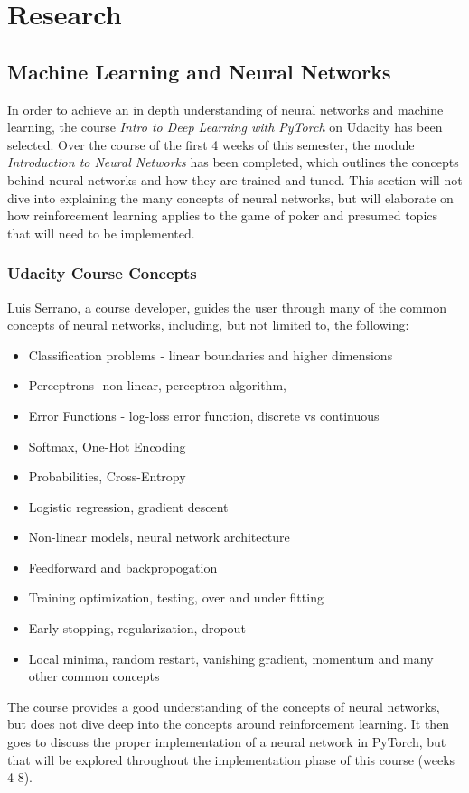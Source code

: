 \documentclass[12pt]{article}
\begin{document}
\section{Research}
\subsection{Machine Learning and Neural Networks}
In order to achieve an in depth understanding of neural networks and machine learning, the course \textit{Intro to Deep Learning with PyTorch} on Udacity has been selected. Over the course of the first 4 weeks of this semester, the module \textit{Introduction to Neural Networks} has been completed, which outlines the concepts behind neural networks and how they are trained and tuned. This section will not dive into explaining the many concepts of neural networks, but will elaborate on how reinforcement learning applies to the game of poker and presumed topics that will need to be implemented.
\subsubsection{Udacity Course Concepts}
Luis Serrano, a course developer, guides the user through many of the common concepts of neural networks, including, but not limited to, the following:

\begin{itemize}
	\item Classification problems - linear boundaries and higher dimensions
	\item Perceptrons- non linear, perceptron algorithm,
	\item Error Functions - log-loss error function, discrete vs continuous
	\item Softmax, One-Hot Encoding
	\item Probabilities, Cross-Entropy
	\item Logistic regression, gradient descent
	\item Non-linear models, neural network architecture 
	\item Feedforward and backpropogation
	\item Training optimization, testing, over and under fitting
	\item Early stopping, regularization, dropout
	\item Local minima, random restart, vanishing gradient, momentum and many other common concepts
\end{itemize}
The course provides a good understanding of the concepts of neural networks, but does not dive deep into the concepts around reinforcement learning. It then goes to discuss the proper implementation of a neural network in PyTorch, but that will be explored throughout the implementation phase of this course (weeks 4-8).
\end{document}
